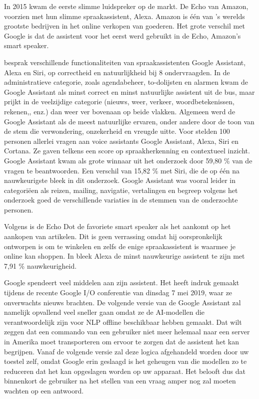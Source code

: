 In 2015 kwam de eerste slimme luidspreker op de markt. De Echo van Amazon, voorzien met hun slimme spraakassistent, Alexa. Amazon is één van 's werelds grootste bedrijven in het online verkopen van goederen. Het grote verschil met Google is dat de assistent voor het eerst werd gebruikt in de Echo, Amazon's smart speaker.

\autocite{Lopez2018} besprak verschillende functionaliteiten van spraakassistenten Google Assistant, Alexa en Siri, op correctheid en natuurlijkheid bij 8 ondervraagden. In de administratieve categorie, zoals agendabeheer, to-dolijsten en alarmen kwam de Google Assistant als minst correct en minst natuurlijke assistent uit de bus, maar prijkt in de veelzijdige categorie (nieuws, weer, verkeer, woordbetekenissen, rekenen,, enz.) dan weer ver bovenaan op beide vlakken. Algemeen werd de Google Assistant als de meest natuurlijke ervaren, onder andere door de toon van de stem die verwondering, onzekerheid en vreugde uitte.
Voor \autocite{Tulshan2019} stelden 100 personen allerlei vragen aan voice assistants Google Assistant, Alexa, Siri en Cortana. Ze gaven telkens een score op spraakherkenning en contextueel inzicht. Google Assistant kwam als grote winnaar uit het onderzoek door 59,80 \% van de vragen te beantwoorden. Een verschil van 15,82 \% met Siri, die de op één na nauwkeurigste bleek in dit onderzoek. Google Assistant was vooral leider in categoriëen als reizen, mailing, navigatie, vertalingen en begreep volgens het onderzoek goed de verschillende variaties in de stemmen van de onderzochte personen.

Volgens \autocite{Lopez2018} is de Echo Dot de favoriete smart speaker als het aankomt op het aankopen van artikelen. Dit is geen verrassing omdat hij oorspronkelijk ontworpen is om te winkelen en zelfs de enige spraakassistent is waarmee je online kan shoppen. In \autocite{Tulshan2019} bleek Alexa de minst nauwkeurige assistent te zijn met 7,91 \% nauwkeurigheid.

Google spendeert veel middelen aan zijn assistent. Het heeft indruk gemaakt tijdens de recente Google I/O conferentie van dinsdag 7 mei 2019, waar ze onverwachts nieuws brachten. De volgende versie van de Google Assistant zal namelijk opvallend veel sneller gaan omdat ze de AI-modellen die verantwoordelijk zijn voor NLP offline beschikbaar hebben gemaakt. Dat wilt zeggen dat een commando van een gebruiker niet meer helemaal naar een server in Amerika moet transporteren om ervoor te zorgen dat de assistent het kan begrijpen. Vanaf de volgende versie zal deze logica afgehandeld worden door uw toestel zelf, omdat Google erin geslaagd is het geheugen van die modellen zo te reduceren dat het kan opgeslagen worden op uw apparaat. Het belooft dus dat binnenkort de gebruiker na het stellen van een vraag amper nog zal moeten wachten op een antwoord.


